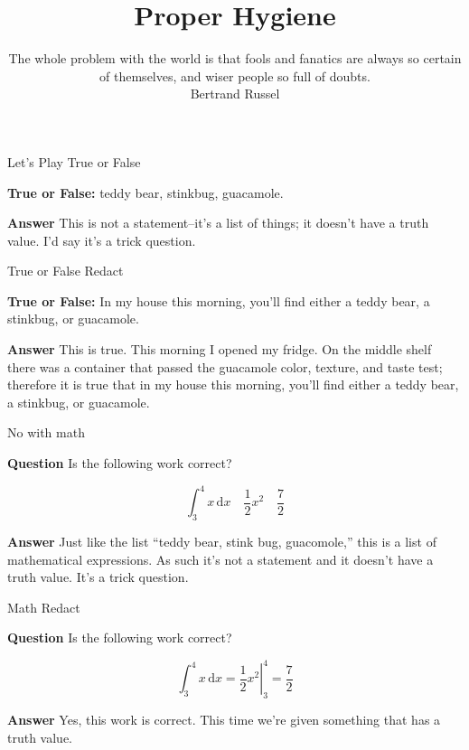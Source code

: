 \documentclass[fleqn]{beamer}
\subtitle{The whole problem with the world is that fools and fanatics are always so certain of themselves, and wiser people so full of doubts. \\ \vspace{0.25in} Bertrand Russel}
\title{\textbf{Proper Hygiene}}
\date{}
\theoremstyle{definition}
\begin{document}
\frame{\titlepage}

\begin{frame}{Let's Play True or False}

    \textbf{True or False:} teddy bear, stinkbug, guacamole.

    \vspace{0.5in}
    \textbf{Answer} This is not a statement--it's a list of things; it doesn't 
    have a truth value. I'd say it's a trick question.

\vfill 
\end{frame}

\begin{frame}{True or False Redact}

  \textbf{True or False:} In my house this morning, you'll 
  find either a teddy bear, a stinkbug, or guacamole.

  \vspace{0.5in}
  \textbf{Answer} This is true. This morning I opened my fridge. On the
  middle shelf there was a container that passed the guacamole color,
  texture, and taste test; therefore it is true that in my house this morning, you'll 
  find either a teddy bear, a stinkbug, or guacamole.

\vfill 
\end{frame}

\begin{frame}{No with math}

  \textbf{Question} Is the following work correct?

  \begin{equation*}
    \int_3^4 x \, \mathrm{d}x \quad 
     \frac{1}{2} x^{2} \quad \frac{7}{2}
  \end{equation*}

  \vspace{0.5in}
  \textbf{Answer} Just like the list ``teddy bear, stink bug, 
  guacomole,''
  this is a list of mathematical expressions. As such it's not 
  a statement and it doesn't have a truth value. It's a trick 
  question.
  \vfill 
\end{frame}

\begin{frame}{Math Redact}

  \textbf{Question} Is the following work correct?

  \begin{equation*}
    \int_3^4 x \, \mathrm{d}x =
     \left. \frac{1}{2} x^{2} \right |_{3}^4 = \frac{7}{2}
  \end{equation*}

  \vspace{0.5in}
  \textbf{Answer} Yes, this work is correct. This time we're 
  given something that has a truth value.

  \vfill
\end{frame}
\end{document}
